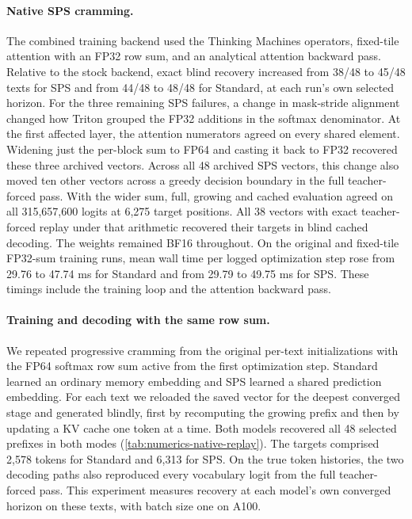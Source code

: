 \paragraph{Native SPS cramming.}
The combined training backend used the Thinking Machines operators, fixed-tile attention with an FP32 row sum, and an analytical attention backward pass. Relative to the stock backend, exact blind recovery increased from 38/48 to 45/48 texts for SPS and from 44/48 to 48/48 for Standard, at each run's own selected horizon.
For the three remaining SPS failures, a change in mask-stride alignment changed how Triton grouped the FP32 additions in the softmax denominator.
At the first affected layer, the attention numerators agreed on every shared element.
Widening just the per-block sum to FP64 and casting it back to FP32 recovered these three archived vectors.
Across all 48 archived SPS vectors, this change also moved ten other vectors across a greedy decision boundary in the full teacher-forced pass.
With the wider sum, full, growing and cached evaluation agreed on all 315,657,600 logits at 6,275 target positions. All 38 vectors with exact teacher-forced replay under that arithmetic recovered their targets in blind cached decoding.
The weights remained BF16 throughout.
On the original and fixed-tile FP32-sum training runs, mean wall time per logged optimization step rose from 29.76 to 47.74 ms for Standard and from 29.79 to 49.75 ms for SPS. These timings include the training loop and the attention backward pass.

\paragraph{Training and decoding with the same row sum.}
We repeated progressive cramming from the original per-text initializations with the FP64 softmax row sum active from the first optimization step. Standard learned an ordinary memory embedding and SPS learned a shared prediction embedding. For each text we reloaded the saved vector for the deepest converged stage and generated blindly, first by recomputing the growing prefix and then by updating a KV cache one token at a time.
Both models recovered all 48 selected prefixes in both modes (\cref{tab:numerics-native-replay}). The targets comprised 2,578 tokens for Standard and 6,313 for SPS. On the true token histories, the two decoding paths also reproduced every vocabulary logit from the full teacher-forced pass. This experiment measures recovery at each model's own converged horizon on these texts, with batch size one on A100.

\begin{table}[htbp]
 \centering\small
 
 \caption{Fresh cramming with a matched FP64 softmax row sum. Mean horizon is measured in target tokens per text. Teacher, Greedy, and Greedy + KV count texts with exact reconstruction of the entire selected prefix. The last column compares cached and full-pass logits on identical token histories.}
 \label{tab:numerics-native-replay}
\end{table}
